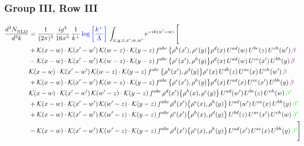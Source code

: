 \documentclass[9pt]{article}
\numberwithin{equation}{section}
\begin{document}
\subsubsection{Group III, Row III} 
\begin{align}
     \frac{d^{3}N_{\rm NLO}^{\rm}}{d^{3}k}  & = \frac{1}{(2\pi)^{3}}\, \frac{ig^{4}}{16\pi^{5}}\, \frac{1}{k^{+}}\, {\color{blue}\log{\left[\frac{k^{+}}{\Lambda}\right]}}\, \int_{x,y,z,x^{\prime},w,w^{\prime}}e^{-ik(w^{\prime}-w)}\, \Bigg[\notag \\ & +\mathcal{K}(x-w)\cdot\mathcal{K}(x'-w')\,\mathcal{K}(w-z)\cdot\mathcal{K}(y-z)\, f^{abc}\,\big\{\rho^{h}(x'),\rho^{e}(y)\big\}\rho^{d}(x)\,U^{ad}(w)\,U^{be}(z)\,U^{ch}(w')\,{\color{violet}\beta}\notag\\
&-\mathcal{K}(x-w)\cdot\mathcal{K}(x'-w')\,\mathcal{K}(w-z)\cdot\mathcal{K}(y-z)\, f^{abc}\,\big\{\rho^{e}(x'),\rho^{h}(y)\big\}\rho^{d}(x)\,U^{ad}(w)\,U^{ce}(x')\,U^{bh}(y)\,{\color{violet}\beta}\notag\\ &\-\mathcal{K}(x-w)\cdot\mathcal{K}(x'-w')\,\mathcal{K}(w-z)\cdot\mathcal{K}(y-z)\, f^{abc}\,\big\{\rho^{h}(x'),\rho^{d}(y)\big\}\rho^{e}(x)\,U^{db}(z)\,U^{ae}(x)\,U^{ch}(w')\,{\color{violet}\beta}\notag\\ & +\mathcal{K}(x-w)\cdot\mathcal{K}(x'-w')\,\mathcal{K}(w-z)\cdot\mathcal{K}(y-z)\, f^{abc}\,\big\{\rho^{e}(x'),\rho^{h}(y)\big\}\rho^{d}(x)\,U^{ad}(x)\,U^{ce}(x')\,U^{bh}(y)\,{\color{violet}\beta}\notag\\ &\-\mathcal{K}(x-w)\cdot\mathcal{K}(x'-w')\,\mathcal{K}(w'-z)\cdot\mathcal{K}(y-z)\, f^{abc}\,\rho^{d}(x')\big\{\rho^{h}(x),\rho^{e}(y)\big\}\,U^{ad}(w')\,U^{be}(z)\,U^{ch}(w)\,{\color{green}\beta'}\notag\\ &+\mathcal{K}(x-w)\cdot\mathcal{K}(x'-w')\,\mathcal{K}(w'-z)\cdot\mathcal{K}(y-z)\, f^{abc}\,\rho^{d}(x')\big\{\rho^{e}(x),\rho^{h}(y)\big\}\,U^{ad}(w')\,U^{ce}(x)\,U^{bh}(y)\,{\color{green}\beta'} \notag\\ & +\mathcal{K}(x-w)\cdot\mathcal{K}(x'-w')\,\mathcal{K}(w'-z)\cdot\mathcal{K}(y-z)\, f^{abc}\,\rho^{e}(x')\big\{\rho^{h}(x),\rho^{d}(y)\big\}\,U^{bd}(z)\,U^{ae}(x')\,U^{ch}(w)\,{\color{green}\beta'} \notag\\ & -\mathcal{K}(x-w)\cdot\mathcal{K}(x'-w')\,\mathcal{K}(w'-z)\cdot\mathcal{K}(y-z)\, f^{abc}\,\rho^{d}(x')\big\{\rho^{e}(x),\rho^{h}(y)\big\}\,U^{ad}(x')\,U^{ce}(x)\,U^{bh}(y)\,{\color{green}\beta'}\Bigg]\end{align}     
\end{document}
